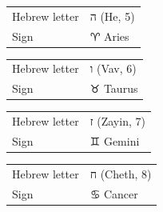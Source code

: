 
\begin{center}
\resizebox{!}{60mm}{\cardAfour}
\end{center}

\vspace{4mm}
\noindent\begin{tabular}{@{}l@{\quad}l@{}}
Hebrew letter & {\hebrewfont ה} (He, 5) \\
Sign & {\symbfont ♈} Aries \\
\end{tabular}


\begin{center}
\resizebox{!}{60mm}{\cardAfive}
\end{center}

\vspace{4mm}
\noindent\begin{tabular}{@{}l@{\quad}l@{}}
Hebrew letter & {\hebrewfont ו} (Vav, 6) \\
Sign & {\symbfont ♉} Taurus \\
\end{tabular}


\begin{center}
\resizebox{!}{60mm}{\cardAsix}
\end{center}

\vspace{4mm}
\noindent\begin{tabular}{@{}l@{\quad}l@{}}
Hebrew letter & {\hebrewfont ז} (Zayin, 7) \\
Sign & {\symbfont ♊} Gemini \\
\end{tabular}


\begin{center}
\resizebox{!}{60mm}{\cardAseven}
\end{center}

\vspace{4mm}
\noindent\begin{tabular}{@{}l@{\quad}l@{}}
Hebrew letter & {\hebrewfont ח} (Cheth, 8) \\
Sign & {\symbfont ♋} Cancer \\
\end{tabular}


